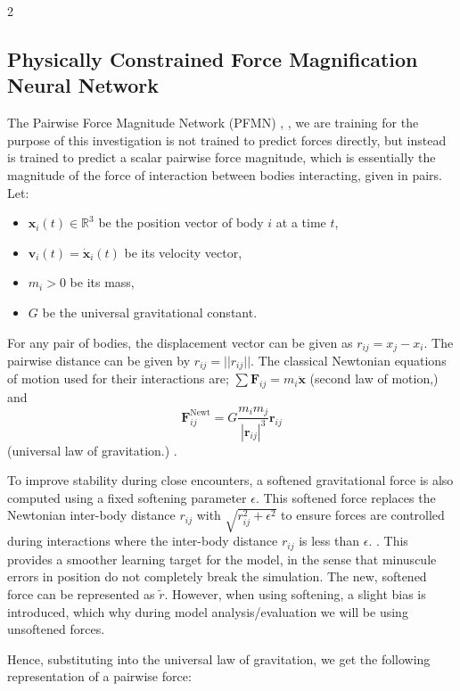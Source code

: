 \documentclass{article}
\begin{document}
\begin{multicols}{2}
\subsection{Physically Constrained Force Magnification Neural Network}
The Pairwise Force Magnitude Network (PFMN) \cite{nguyen2021pairwise}, \cite{battaglia2016interaction}, we are training for the purpose of this investigation is not trained to predict forces directly, but instead is trained to predict a scalar pairwise force magnitude, which is essentially the magnitude of the force of interaction between bodies interacting, given in pairs. Let: 
\begin{itemize}
    \item \textbf{$\mathbf{x}_i(t) \in \mathbb{R}^3$} be the position vector of body $i$ at a time $t$,
    \item \textbf{$\mathbf{v}_i (t) = \mathbf{\dot x}_i(t)$} be its velocity vector,
    \item \textbf{$m_i > 0$} be its mass,
    \item \textbf{$G$} be the universal gravitational constant.
\end{itemize}

For any pair of bodies, the displacement vector can be given as $r_{ij} = x_j - x_i$. The pairwise distance can be given by $r_{ij} = ||r_{ij}||$. The classical Newtonian equations of motion used for their interactions are;  $\sum \mathbf{F}_{ij} = m_i \mathbf{\ddot x}$ (second law of motion,) and $$\mathbf{F}_{ij}^{\text{Newt}} = G \frac{m_i m_j}{|\mathbf{r}_{ij}|^3} \mathbf{r}_{ij}$$ (universal law of gravitation.) \cite{murray1999solar}.

To improve stability during close encounters, a softened gravitational force is also computed using a fixed softening parameter $\epsilon$. This softened force replaces the Newtonian inter-body distance $r_{ij}$ with $\sqrt{r^2_{ij} + \epsilon^2}$ to ensure forces are controlled during interactions where the inter-body distance $r_{ij}$ is less than $\epsilon$. \cite{Dehnen2001}. This provides a smoother learning target for the model, in the sense that minuscule errors in position do not completely break the simulation. The new, softened force can be represented as $\tilde{r}$. However, when using softening, a slight bias is introduced, which why during model analysis/evaluation we will be using unsoftened forces.

Hence, substituting into the universal law of gravitation, we get the following representation of a pairwise force:


\end{multicols}
\end{document}
